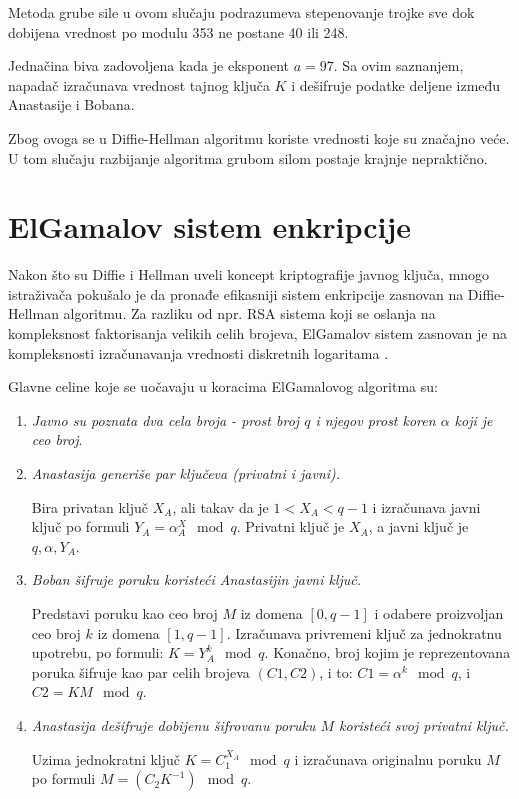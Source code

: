 \documentclass[a4paper]{article}
\begin{document}
Metoda grube sile u ovom slučaju podrazumeva stepenovanje trojke sve dok dobijena vrednost po modulu 353 ne postane 40 ili 248.

Jednačina biva zadovoljena kada je eksponent $a=97$. Sa ovim saznanjem, napadač izračunava vrednost tajnog ključa $K$ i dešifruje podatke deljene između Anastasije i Bobana.

Zbog ovoga se u Diffie-Hellman algoritmu koriste vrednosti koje su značajno veće. U tom slučaju razbijanje algoritma grubom silom postaje krajnje nepraktično.
 
\section{ElGamalov sistem enkripcije}
\label{sec:Elgamal}
Nakon što su Diffie i Hellman uveli koncept kriptografije javnog ključa, mnogo istraživača pokušalo je da pronađe efikasniji sistem enkripcije zasnovan na Diffie-Hellman algoritmu. Za razliku od npr. RSA sistema \cite{dhpaper} koji se oslanja na kompleksnost faktorisanja velikih celih brojeva, ElGamalov sistem zasnovan je na kompleksnosti izračunavanja vrednosti diskretnih logaritama \cite{elgamal}.

Glavne celine koje se uočavaju u koracima ElGamalovog algoritma su:
\begin{enumerate}
    \item \emph {Javno su poznata dva cela broja - prost broj $q$ i njegov prost koren $\alpha$ koji je ceo broj}.
    
    \item \emph {Anastasija generiše par ključeva (privatni i javni).}
    
    Bira privatan ključ $X_A$, ali takav da je $1<X_A<q-1$ i izračunava javni ključ po formuli $Y_A=\alpha^X_A\mod q$. Privatni ključ je $X_A$, a javni ključ je ${q,\alpha,Y_A}$.
    
    \item \emph {Boban šifruje poruku koristeći Anastasijin javni ključ.}
    
        Predstavi poruku kao ceo broj $M$ iz domena $[0,q-1]$ i odabere proizvoljan ceo broj $k$ iz domena $[1,q-1]$. Izračunava privremeni ključ za jednokratnu upotrebu, po formuli: $K=Y_A^k\mod q$. Konačno, broj kojim je reprezentovana poruka šifruje kao par celih brojeva $(C1,C2)$, i to: $C1=\alpha^k \mod q$, i $C2=KM\mod q$.
        
    \item \emph {Anastasija dešifruje dobijenu šifrovanu poruku $M$ koristeći svoj privatni ključ.}
    
        Uzima jednokratni ključ $K=C_1^{X_A}\mod q$ i izračunava originalnu poruku $M$ po formuli $M=(C_2K^{-1})\mod q$.
\end{enumerate}
\end{document}
